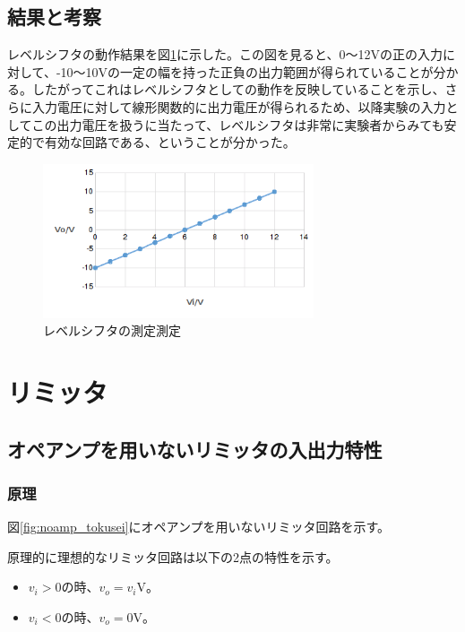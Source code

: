 \documentclass[11pt,a4j]{jsarticle}
\begin{document}
   
  \subsection{結果と考察} \label{sec:le_kousatu}
  レベルシフタの動作結果を図\ref{fig:1_0}に示した。この図を見ると、0～12Vの正の入力に対して、-10～10Vの一定の幅を持った正負の出力範囲が得られていることが分かる。したがってこれはレベルシフタとしての動作を反映していることを示し、さらに入力電圧に対して線形関数的に出力電圧が得られるため、以降実験の入力としてこの出力電圧を扱うに当たって、レベルシフタは非常に実験者からみても安定的で有効な回路である、ということが分かった。
  
   \begin{figure}[htbp]
  \centering
  \includegraphics[width=8cm,clip]{1_0.png}
  \caption{レベルシフタの測定測定}
  \label{fig:1_0}
 \end{figure}%
   
   \clearpage
   
 \section{リミッタ}
  \subsection{オペアンプを用いないリミッタの入出力特性}
   \subsubsection{原理}
    
    図\ref{fig:noamp_tokusei}にオペアンプを用いないリミッタ回路を示す。
    
    原理的に理想的なリミッタ回路は以下の2点の特性を示す。
    \begin{itemize}
    \item $v_i > 0$の時、$v_o = v_i$V。
    \item $v_i < 0$の時、$v_o = 0$V。
    \end{itemize}
    
\end{document}
